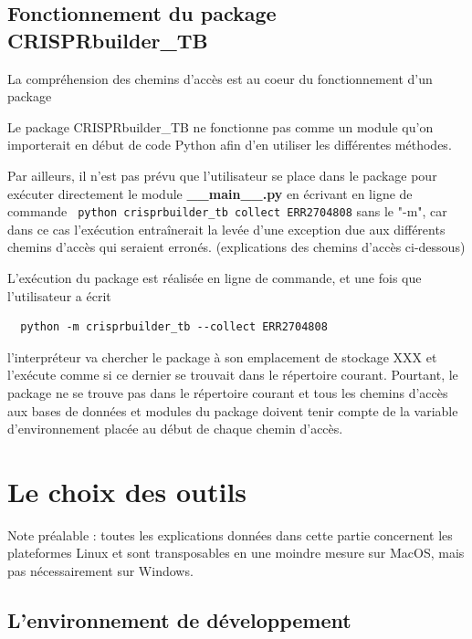 \documentclass[twoside,a4paper,11pt,frenchb,openany]{report}
\begin{document}
\section{Fonctionnement du package CRISPRbuilder\_TB}

La compréhension des chemins d'accès est au coeur du fonctionnement d'un package

Le package CRISPRbuilder\_TB ne fonctionne pas comme un module qu'on importerait en début de code Python afin d'en utiliser les différentes méthodes.

Par ailleurs, il n'est pas prévu que l'utilisateur se place dans le package pour exécuter directement le module \textbf{\_\_main\_\_.py} en écrivant en ligne de commande
\texttt{ python crisprbuilder\_tb \textemdash \textemdash collect ERR2704808}
sans le "-m", car dans ce cas l'exécution entraînerait la levée d'une exception due aux différents chemins d'accès qui seraient erronés. (explications des chemins d'accès ci-dessous)

L'exécution du package est réalisée en ligne de commande, et une fois que l'utilisateur a écrit 
\begin{verbatim}  python -m crisprbuilder_tb --collect ERR2704808\end{verbatim}

l'interpréteur va chercher le package à son emplacement de stockage XXX et l'exécute comme si ce dernier se trouvait dans le répertoire courant. Pourtant, le package ne se trouve pas dans le répertoire courant et tous les chemins d'accès aux bases de données et modules du package doivent tenir compte de la variable d'environnement placée au début de chaque chemin d'accès.


\chapter{Le choix des outils}

Note préalable : toutes les explications données dans cette partie concernent les plateformes Linux et sont transposables en une moindre mesure sur MacOS, mais pas nécessairement sur Windows.




\section{L'environnement de développement}
\end{document}
